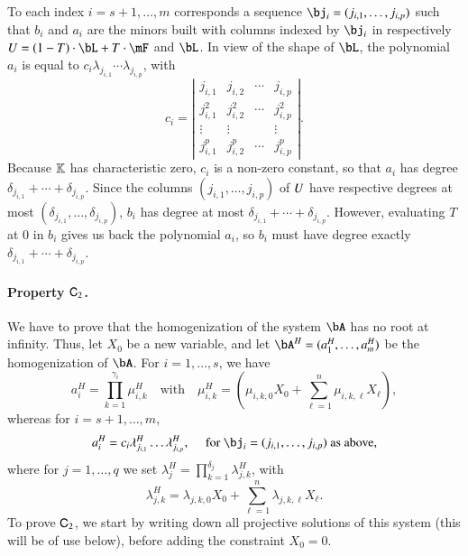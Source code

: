 \documentclass[amsthm]{elsart}
\begin{document}
To each index $i=s+1,\dots,m$ corresponds a sequence
$\bj_i=(j_{i,1},\dots,j_{i,p})$ such that $b_i$ and $a_i$ are the
minors built with columns indexed by $\bj_i$ in respectively
$\mU=(1-T)\cdot \bL + T \cdot \mF$ and $\bL$. In view of the shape of
$\bL$, the polynomial $a_i$ is equal to $c_i\lambda_{j_{i,1}}\cdots
\lambda_{j_{i,p}}$, with
$$c_i = \left | 
\begin{matrix}
j_{i,1} & j_{i,2} & \cdots & j_{i,p}\\
j_{i,1}^2 & j_{i,2}^2 & \cdots & j_{i,p}^2\\
\vdots & \vdots &  & \vdots \\
j_{i,1}^p & j_{i,2}^p & \cdots & j_{i,p}^p
\end{matrix}
\right |.$$
Because $\mathbb{K}$ has characteristic zero,
 $c_i$ is a non-zero constant, so that $a_i$ has degree $\delta_{j_{i,1}} +
\cdots + \delta_{j_{i,p}}$.  Since the columns
$(j_{i,1},\dots,j_{i,p})$ of ${U}$ have respective degrees at most
$(\delta_{j_{i,1}},\dots,\delta_{j_{i,p}})$, $b_i$ has degree at most
$\delta_{j_{i,1}} + \cdots + \delta_{j_{i,p}}$. However, evaluating
$T$ at $0$ in $b_i$ gives us back the polynomial $a_i$, so $b_i$ must
have degree exactly $\delta_{j_{i,1}} + \cdots + \delta_{j_{i,p}}$.

\paragraph*{Property $\mathsf{C}_2$.} We have to prove that the homogenization
of the system $\bA$ has no root at infinity. Thus, let $X_0$ be a new
variable, and let $\bA^H=(a_1^H,\dots,a_m^H)$ be the homogenization
of $\bA$. For $i=1,\dots,s$, we have
$$a_i^H=\prod_{k=1}^{\gamma_i} \mu^H_{i,k} \quad\text{with}\quad \mu^H_{i,k}=(\mu_{i,k,0}X_0 + \sum_{\ell = 1}^{n}\mu_{i,k,\ell}X_\ell),$$
whereas for $i=s+1,\dots,m$, 
$$a_i^H=c_i \lambda^H_{j_{i,1}}\ldots \lambda^H_{j_{i,p}}, \quad \text{~for~} \bj_i=(j_{i,1},\dots,j_{i,p}) \text{~as above},$$
where for $j=1,\dots,q$ we set 
$\lambda^H_j = \prod_{k=1}^{\delta_j}\lambda^H_{j,k}$,
with
$$\lambda^H_{j,k}=\lambda_{j,k,0}X_0 + \sum_{\ell = 1}^{n}\lambda_{j,k,\ell}X_\ell.$$
To prove  $\mathsf{C}_2$, we start by writing down all projective
solutions of this system (this will be of use below), before adding
the constraint $X_0=0$.
\end{document}
